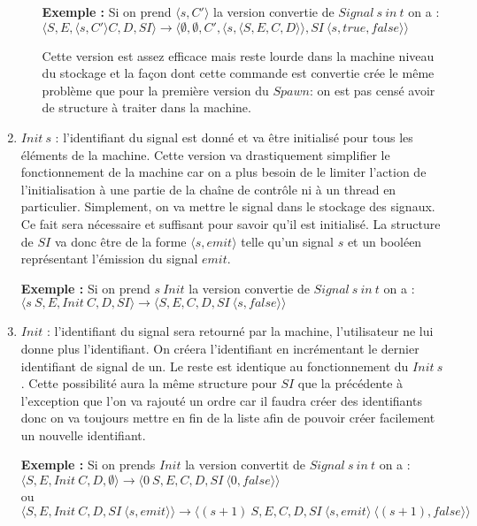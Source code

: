 \documentclass[10pt,a4paper]{article}
\begin{document}
\begin{enumerate}
\begin{enumerate}
							\textbf{Exemple :} Si on prend $\langle s,C'\rangle$ la version convertie de $Signal~s~in~t$ on a : 
							\\$\langle S,E,\langle s,C'\rangle C,D,SI\rangle \longrightarrow \langle \emptyset,\emptyset,C',\langle s,\langle S,E,C,D\rangle\rangle,SI~\langle s,true,false\rangle \rangle$ 
							\medbreak
								
							Cette version est assez efficace mais reste lourde dans la machine niveau du stockage et la façon dont cette commande est convertie crée le même problème que pour la première version du $Spawn$:  on est pas censé avoir de structure à traiter dans la machine.
						\end{enumerate}
						
						\item $Init~s$ : l'identifiant du signal est donné et va être initialisé pour tous les éléments de la machine. Cette version va drastiquement simplifier le fonctionnement de la machine car on a plus besoin de le limiter l'action de l'initialisation à une partie de la chaîne de contrôle ni à un thread en particulier. Simplement, on va mettre le signal dans le stockage des signaux. Ce fait sera nécessaire et suffisant pour savoir qu'il est initialisé. La structure de $SI$ va donc être de la forme $\langle s,emit\rangle$ telle qu'un signal $s$ et un booléen représentant l'émission du signal $emit$.
						\medbreak
							
						\textbf{Exemple :} Si on prend $s~Init$ la version convertie de $Signal~s~in~t$ on a : 
						\\$\langle s~S,E,Init~C,D,SI\rangle \longrightarrow \langle S,E,C,D,SI~\langle s,false\rangle \rangle$ 
						\medbreak
							
						\item $Init$ : l'identifiant du signal sera retourné par la machine, l'utilisateur ne lui donne plus l'identifiant. On créera l'identifiant en incrémentant le dernier identifiant de signal de un. Le reste est identique au fonctionnement du $Init~s$. Cette possibilité aura la même structure pour $SI$ que la précédente à l'exception que l'on va rajouté un ordre car il faudra créer des identifiants donc on va toujours mettre en fin de la liste afin de pouvoir créer facilement un nouvelle identifiant.
						\medbreak
							
						\textbf{Exemple :} Si on prends $Init$ la version convertit de $Signal~s~in~t$ on a : 
						\\$\langle S,E,Init~C,D,\emptyset\rangle \longrightarrow \langle 0~S,E,C,D,SI~\langle 0,false\rangle \rangle$ 
						\\ou
						\\$\langle S,E,Init~C,D,SI~\langle s,emit\rangle\rangle \longrightarrow \langle (s+1)~S,E,C,D,SI~\langle s,emit\rangle~\langle (s+1),false\rangle \rangle$ 
						\medbreak
					\end{enumerate}
					\bigbreak
						
\end{document}
